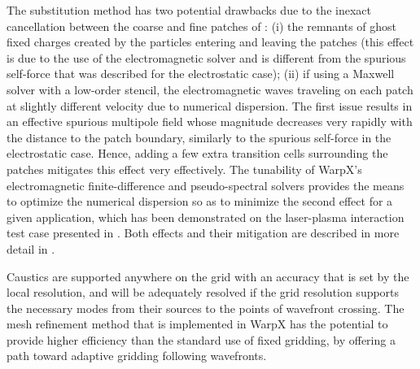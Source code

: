 The substitution method has two potential drawbacks due to the inexact cancellation between the coarse and fine patches of : (i) the remnants of ghost fixed charges created by the particles entering and leaving the patches (this effect is due to the use of the electromagnetic solver and is different from the spurious self-force that was described for the electrostatic case); (ii) if using a Maxwell solver with a low-order stencil, the electromagnetic waves traveling on each patch at slightly different velocity due to numerical dispersion. 
The first issue results in an effective spurious multipole field whose magnitude decreases very rapidly with the distance to the patch boundary, similarly to the spurious self-force in the electrostatic case. Hence, adding a few extra transition cells surrounding the patches mitigates this effect very effectively. 
The tunability of WarpX's electromagnetic finite-difference and pseudo-spectral solvers provides the means to optimize the numerical dispersion so as to minimize the second effect for a given application, which has been demonstrated on the laser-plasma interaction test case presented in \cite{Vaycpc04}. 
Both effects and their mitigation are described in more detail in \cite{Vaycpc04}. 

Caustics are supported anywhere on the grid with an accuracy that is set by the local resolution, and will be adequately resolved if the grid resolution supports the necessary  modes from their sources to the points of wavefront crossing. The mesh refinement method that is implemented in WarpX has the potential to provide higher efficiency than the standard use of fixed gridding, by offering a path toward adaptive gridding following wavefronts. 

